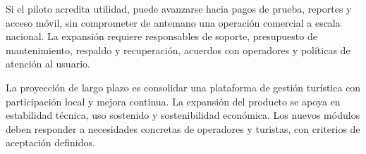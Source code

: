 Si el piloto acredita utilidad, puede avanzarse hacia pagos de prueba, reportes y acceso móvil, sin comprometer de antemano una operación comercial a escala nacional. La expansión requiere responsables de soporte, presupuesto de mantenimiento, respaldo y recuperación, acuerdos con operadores y políticas de atención al usuario.

La proyección de largo plazo es consolidar una plataforma de gestión turística con participación local y mejora continua. La expansión del producto se apoya en estabilidad técnica, uso sostenido y sostenibilidad económica. Los nuevos módulos deben responder a necesidades concretas de operadores y turistas, con criterios de aceptación definidos.
